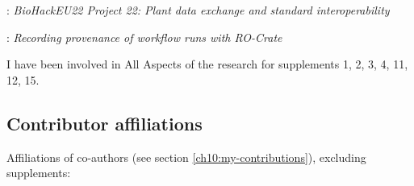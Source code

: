 : \emph{BioHackEU22 Project 22: Plant data exchange and standard interoperability}

: \emph{Recording provenance of workflow runs with RO-Crate}

I have been involved in All Aspects of the research for supplements 1, 2,
3, 4, 11, 12, 15.


\subsection{Contributor affiliations}\label{ch10:contributor-affiliations}

Affiliations of co-authors (see section \vref{ch10:my-contributions}), excluding supplements:

